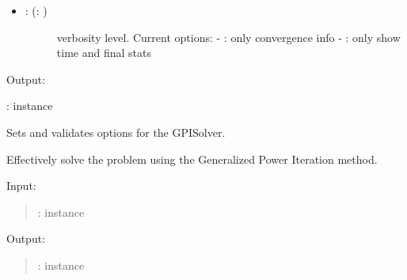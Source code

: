 \documentclass[a4paper,10pt,english]{sphinxmanual}
\begin{document}
\begin{fulllineitems}
\begin{description}
\begin{itemize}
\begin{description}
\end{description}

\item {} \begin{description}
\item[{: (: )}] \leavevmode
verbosity level. Current options:
- : only convergence info
- : only show time and final stats

\end{description}

\end{itemize}

\end{description}

Output:

:  instance

\begin{fulllineitems}
\label{\detokenize{skprocrustes:skprocrustes.GPISolver._setoptions}}
Sets and validates options for the GPISolver.


\end{fulllineitems}


\begin{fulllineitems}
\label{\detokenize{skprocrustes:skprocrustes.GPISolver.solve}}
Effectively solve the problem using the Generalized Power Iteration
method.

Input:
\begin{quote}

:  instance
\end{quote}

Output:
\begin{quote}

:  instance
\end{quote}

\end{fulllineitems}


\end{fulllineitems}
\end{document}
